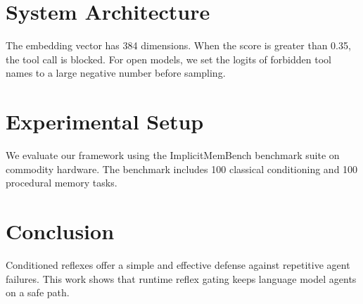 \documentclass[10pt,conference]{IEEEtran}
\begin{document}
\section{System Architecture}
The embedding vector has 384 dimensions. When the score is greater than 0.35, the tool call is blocked. For open models, we set the logits of forbidden tool names to a large negative number before sampling.

\section{Experimental Setup}
We evaluate our framework using the ImplicitMemBench benchmark suite on commodity hardware. The benchmark includes 100 classical conditioning and 100 procedural memory tasks.

\section{Conclusion}
Conditioned reflexes offer a simple and effective defense against repetitive agent failures. This work shows that runtime reflex gating keeps language model agents on a safe path.
\end{document}

